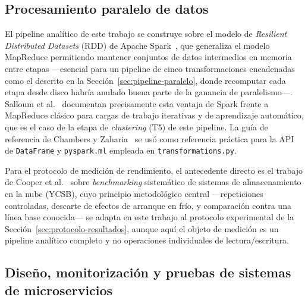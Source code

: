 \subsection{Procesamiento paralelo de datos}

El pipeline analítico de este trabajo se construye sobre el modelo de \emph{Resilient Distributed
Datasets} (RDD) de Apache Spark~\cite{zaharia2012rdd}, que generaliza el modelo MapReduce
permitiendo mantener conjuntos de datos intermedios en memoria entre etapas —esencial para un
pipeline de cinco transformaciones encadenadas como el descrito en la
Sección~\ref{sec:pipeline-paralelo}, donde recomputar cada etapa desde disco habría anulado buena
parte de la ganancia de paralelismo—. Salloum et al.~\cite{salloum2016bigdata} documentan
precisamente esta ventaja de Spark frente a MapReduce clásico para cargas de trabajo iterativas y
de aprendizaje automático, que es el caso de la etapa de \emph{clustering} (T5) de este pipeline.
La guía de referencia de Chambers y Zaharia~\cite{chambers2018spark} se usó como referencia práctica
para la API de \texttt{DataFrame} y \texttt{pyspark.ml} empleada en \texttt{transformations.py}.

Para el protocolo de medición de rendimiento, el antecedente directo es el trabajo de
Cooper et al.~\cite{cooper2010ycsb} sobre \emph{benchmarking} sistemático de sistemas de
almacenamiento en la nube (YCSB), cuyo principio metodológico central —repeticiones controladas,
descarte de efectos de arranque en frío, y comparación contra una línea base conocida— se adapta en
este trabajo al protocolo experimental de la Sección~\ref{sec:protocolo-resultados}, aunque aquí el
objeto de medición es un pipeline analítico completo y no operaciones individuales de
lectura/escritura.

\subsection{Diseño, monitorización y pruebas de sistemas de microservicios}

